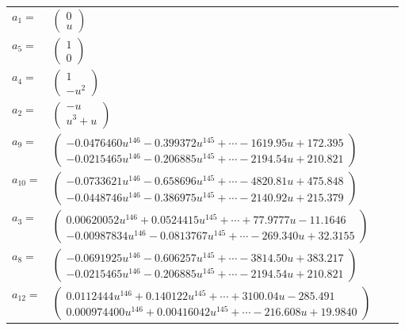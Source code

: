 \documentclass[1p]{elsarticle_modified}
\theoremstyle{definition}
\begin{document}
\begin{tabular}{m{7pt} m{180pt} m{7pt} m{180pt} }
\flushright $a_{1}=$&$\begin{pmatrix}0\\u\end{pmatrix}$ \\
\flushright $a_{5}=$&$\begin{pmatrix}1\\0\end{pmatrix}$ \\
\flushright $a_{4}=$&$\begin{pmatrix}1\\- u^2\end{pmatrix}$ \\
\flushright $a_{2}=$&$\begin{pmatrix}- u\\u^3+u\end{pmatrix}$ \\
\flushright $a_{9}=$&$\begin{pmatrix}-0.0476460 u^{146}-0.399372 u^{145}+\cdots-1619.95 u+172.395\\-0.0215465 u^{146}-0.206885 u^{145}+\cdots-2194.54 u+210.821\end{pmatrix}$ \\
\flushright $a_{10}=$&$\begin{pmatrix}-0.0733621 u^{146}-0.658696 u^{145}+\cdots-4820.81 u+475.848\\-0.0448746 u^{146}-0.386975 u^{145}+\cdots-2140.92 u+215.379\end{pmatrix}$ \\
\flushright $a_{3}=$&$\begin{pmatrix}0.00620052 u^{146}+0.0524415 u^{145}+\cdots+77.9777 u-11.1646\\-0.00987834 u^{146}-0.0813767 u^{145}+\cdots-269.340 u+32.3155\end{pmatrix}$ \\
\flushright $a_{8}=$&$\begin{pmatrix}-0.0691925 u^{146}-0.606257 u^{145}+\cdots-3814.50 u+383.217\\-0.0215465 u^{146}-0.206885 u^{145}+\cdots-2194.54 u+210.821\end{pmatrix}$ \\
\flushright $a_{12}=$&$\begin{pmatrix}0.0112444 u^{146}+0.140122 u^{145}+\cdots+3100.04 u-285.491\\0.000974400 u^{146}+0.00416042 u^{145}+\cdots-216.608 u+19.9840\end{pmatrix}$ \\

\end{tabular}
\end{document}

